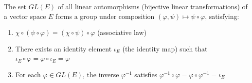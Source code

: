 The set $GL(E)$ of all linear automorphisms (bijective linear transformations) of a vector space $E$ forms a group under composition $(\varphi, \psi) \mapsto \psi \circ \varphi$, satisfying:
\begin{enumerate}
\item $\chi \circ (\psi \circ \varphi) = (\chi \circ \psi) \circ \varphi$ (associative law)
\item There exists an identity element $\iota_E$ (the identity map) such that $\iota_E \circ \varphi = \varphi \circ \iota_E = \varphi$
\item For each $\varphi \in GL(E)$, the inverse $\varphi^{-1}$ satisfies $\varphi^{-1} \circ \varphi = \varphi \circ \varphi^{-1} = \iota_E$
\end{enumerate}
